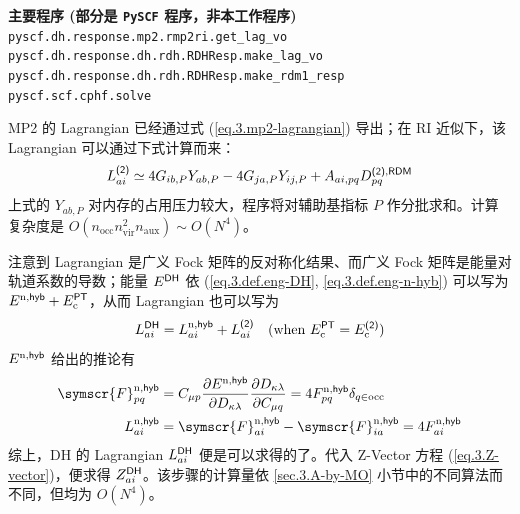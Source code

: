\begin{tcolorbox}
    \textbf{主要程序 (部分是 \texttt{PySCF} 程序，非本工作程序)}\\
    \verb|pyscf.dh.response.mp2.rmp2ri.get_lag_vo|\\
    \verb|pyscf.dh.response.dh.rdh.RDHResp.make_lag_vo|\\
    \verb|pyscf.dh.response.dh.rdh.RDHResp.make_rdm1_resp|\\
    \verb|pyscf.scf.cphf.solve|
\end{tcolorbox}

MP2 的 Lagrangian 已经通过式 (\ref{eq.3.mp2-lagrangian}) 导出；在 RI 近似下，该 Lagrangian 可以通过下式计算而来：
\begin{equation}
    \label{eq.3.Lai-mp2-ri}
    L_{ai}^{\textsf{(2)}} \simeq 4 G_{ib, P} Y_{ab, P} - 4 G_{ja, P} Y_{ij, P} + A_{ai, pq} D_{pq}^{\textsf{(2)}, \textsf{RDM}}
\end{equation}
上式的 $Y_{ab, P}$ 对内存的占用压力较大，程序将对辅助基指标 $P$ 作分批求和。计算复杂度是 $O(n_\mathrm{occ} n_\mathrm{vir}^2 n_\mathrm{aux}) \sim O(N^4)$。

注意到 Lagrangian 是广义 Fock 矩阵的反对称化结果、而广义 Fock 矩阵是能量对轨道系数的导数；能量 $E^{\textsf{DH}}$ 依 (\ref{eq.3.def.eng-DH}, \ref{eq.3.def.eng-n-hyb}) 可以写为 $E^{\mathrm{n}, \textsf{hyb}} + E_\mathrm{c}^{\textsf{PT}}$，从而 Lagrangian 也可以写为
\begin{equation}
    L_{ai}^{\textsf{DH}} = L_{ai}^{\mathrm{n}, \textsf{hyb}} + L_{ai}^{\textsf{(2)}} \quad (\text{when $E_\mathrm{c}^{\textsf{PT}} = E_\mathrm{c}^{\textsf{(2)}}$})
\end{equation}
$E^{\mathrm{n}, \textsf{hyb}}$ 给出的推论有
\begin{align}
    \symscr{F}_{pq}^{\mathrm{n}, \textmt{hyb}} &= C_{\mu p} \frac{\partial E^{\mathrm{n}, \textmt{hyb}}}{\partial D_{\kappa \lambda}} \frac{\partial D_{\kappa \lambda}}{\partial C_{\mu q}} = 4 F_{pq}^{\mathrm{n}, \textmt{hyb}} \delta_{q \in \mathrm{occ}} \\
    \label{eq.3.Lai-n-hyb}
    L_{ai}^{\mathrm{n}, \textmt{hyb}} &= \symscr{F}_{ai}^{\mathrm{n}, \textmt{hyb}} - \symscr{F}_{ia}^{\mathrm{n}, \textmt{hyb}} = 4 F_{ai}^{\mathrm{n}, \textmt{hyb}}
\end{align}
综上，DH 的 Lagrangian $L_{ai}^{\textsf{DH}}$ 便是可以求得的了。代入 Z-Vector 方程 (\ref{eq.3.Z-vector})，便求得 $Z_{ai}^{\textsf{DH}}$。该步骤的计算量依 \ref{sec.3.A-by-MO} 小节中的不同算法而不同，但均为 $O(N^4)$。

